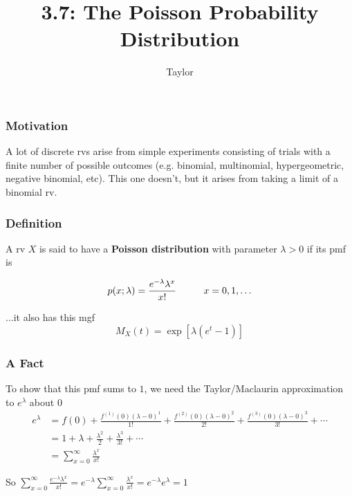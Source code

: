 \documentclass{beamer}
\title["3.7"]{3.7: The Poisson Probability Distribution}
\author{Taylor}
\institute[UVA] 
{
University of Virginia \\
\medskip
\textit{} 
}
\date{}
\begin{document}

\begin{frame}
\titlepage 
\end{frame}

\begin{frame}
\frametitle{Motivation}

A lot of discrete rvs arise from simple experiments consisting of trials with a finite number of possible outcomes (e.g. binomial, multinomial, hypergeometric, negative binomial, etc). This one doesn't, but it arises from taking a limit of a binomial rv.
\end{frame}


\begin{frame}
\frametitle{Definition}

A rv $X$ is said to have a \textbf{Poisson distribution} with parameter $\lambda > 0$ if its pmf is 

\[
p(x;\lambda) = \frac{e^{-\lambda}\lambda^x}{x!} \hspace{10mm} x = 0, 1, \ldots
\]

...it also has this mgf
\[
M_X(t) = \exp\left[ \lambda (e^t-1)\right]
\]

\end{frame}


\begin{frame}
\frametitle{A Fact}

To show that this pmf sums to $1$, we need the Taylor/Maclaurin approximation to $e^{\lambda}$ about $0$
\begin{align*}
e^{\lambda} &= f(0) +\frac{f^{(1)}(0)(\lambda-0)^1}{1!} + \frac{f^{(2)}(0)(\lambda-0)^2}{2!} + \frac{f^{(3)}(0)(\lambda-0)^3}{3!} + \cdots \\
&= 1 + \lambda + \frac{\lambda^2}{2} + \frac{\lambda^3}{3!} + \cdots \\
&= \sum_{x=0}^{\infty} \frac{\lambda^x}{x!}
\end{align*}

So $\sum_{x=0}^{\infty} \frac{e^{-\lambda}\lambda^x}{x!} = e^{-\lambda} \sum_{x=0}^{\infty} \frac{\lambda^x}{x!}=e^{-\lambda} e^{\lambda} = 1$



\end{frame}
\end{document}
